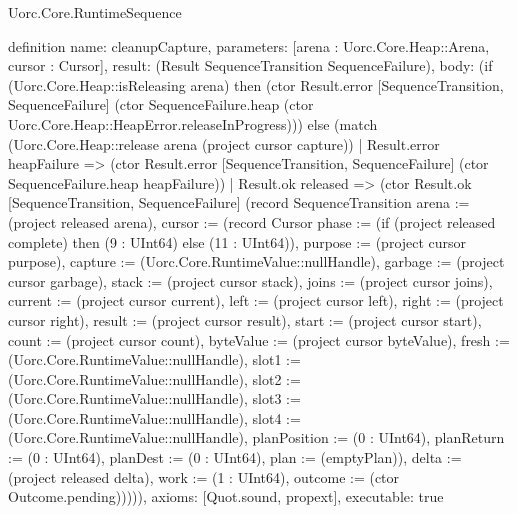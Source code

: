 \begin{lexlean}{Uorc.Core.RuntimeSequence}
\begin{semanticmodule}
definition{
  name: cleanupCapture,
  parameters: [arena : Uorc.Core.Heap::Arena, cursor : Cursor],
  result: (Result SequenceTransition SequenceFailure),
  body: (if (Uorc.Core.Heap::isReleasing arena) then (ctor Result.error [SequenceTransition, SequenceFailure] (ctor SequenceFailure.heap (ctor Uorc.Core.Heap::HeapError.releaseInProgress))) else (match (Uorc.Core.Heap::release arena (project cursor capture))
    | Result.error heapFailure => (ctor Result.error [SequenceTransition, SequenceFailure] (ctor SequenceFailure.heap heapFailure))
    | Result.ok released => (ctor Result.ok [SequenceTransition, SequenceFailure] (record SequenceTransition {arena := (project released arena), cursor := (record Cursor {phase := (if (project released complete) then (9 : UInt64) else (11 : UInt64)), purpose := (project cursor purpose), capture := (Uorc.Core.RuntimeValue::nullHandle), garbage := (project cursor garbage), stack := (project cursor stack), joins := (project cursor joins), current := (project cursor current), left := (project cursor left), right := (project cursor right), result := (project cursor result), start := (project cursor start), count := (project cursor count), byteValue := (project cursor byteValue), fresh := (Uorc.Core.RuntimeValue::nullHandle), slot1 := (Uorc.Core.RuntimeValue::nullHandle), slot2 := (Uorc.Core.RuntimeValue::nullHandle), slot3 := (Uorc.Core.RuntimeValue::nullHandle), slot4 := (Uorc.Core.RuntimeValue::nullHandle), planPosition := (0 : UInt64), planReturn := (0 : UInt64), planDest := (0 : UInt64), plan := (emptyPlan)}), delta := (project released delta), work := (1 : UInt64), outcome := (ctor Outcome.pending)})))),
  axioms: [Quot.sound, propext],
  executable: true
}


\end{semanticmodule}
\end{lexlean}
